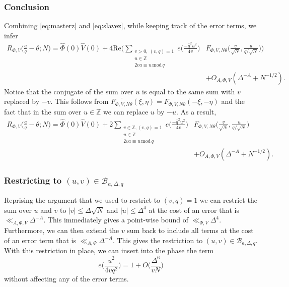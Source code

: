 \documentclass[12pt,reqno]{amsart}
\theoremstyle{plain}
\numberwithin{equation}{section}
\numberwithin{figure}{section}
\theoremstyle{plain}
\theoremstyle{definition}
\theoremstyle{remark}
\newcommand{\mmod}{\,\mathrm{mod}\,}
\begin{document}
\subsubsection{Conclusion} Combining \eqref{eq:masterz} and \eqref{eq:slavez},
while keeping track of the error terms,
we infer
\begin{align*}
R_{\Phi, V} \Big ( \frac{a}{q} - \theta; N \Big ) 
= \widehat{\Phi}(0) \widehat{V}(0) + 4  \mathrm{Re} \Big (  
\sum_{\substack{v > 0, \ (v,q) = 1 \\ u \in \mathbb{Z} \\ 2 v a \equiv u \mmod{q}}}   
e \Big (  \frac{- \overline{q}^2 u^2}{4 v} \Big ) &
 F_{\Phi, V, N \theta} 
 \Big ( \frac{v}{\sqrt{N}}, 
 \frac{u}{q / \sqrt{N}} \Big ) \Big ) \\ & 
 + O_{A, \Phi, V}( \Delta^{-A} + N^{-1/2} ).
\end{align*}
Notice that the conjugate of the sum over $u$ is equal to the same sum with $v$ replaced by $-v$. This follows from $\overline{F_{\Phi, V, N \theta}}(\xi, \eta) = F_{\Phi, V, N \theta}( -\xi, -\eta)$ and the fact that in the sum over $u \in \mathbb{Z}$ we can replace $u$ by $-u$. As a result, 
\begin{align*}
R_{\Phi, V} \Big ( \frac{a}{q} - \theta; N \Big ) 
= \widehat{\Phi}(0)\widehat{V}(0) + 
2 \sum_{\substack{
 v \in \mathbb{Z}, (v,q) = 1 \\ u \in \mathbb{Z} \\ 2 v a \equiv u \mmod{q}}}  
e \Big (  \frac{- \overline{q}^2 u^2}{4 v} \Big ) &
 F_{\Phi, V,N \theta} \Big ( \frac{v}{\sqrt{N}}, \frac{u}{q / \sqrt{N}} \Big ) \\ & + O_{A, \Phi, V}(\Delta^{-A} + N^{-1/2}).
\end{align*}

\subsubsection{Restricting to $(u,v) \in \mathcal{B}_{a, \Delta, q}$}

Reprising the argument that we used to restrict to $(v,q) = 1$ we can restrict the sum over $u$ and $v$ to $|v| \leq \Delta \sqrt{N}$ and $|u| \leq \Delta^4$ at the cost of an error that is $\ll_{A, \Phi, V} \Delta^{-A}$. This immediately gives a point-wise bound of $\ll_{\Phi, V} \Delta^4$. Furthermore, we can then extend the $v$ sum back to include all terms at the cost of an error term that is $\ll_{A, \Phi} \Delta^{-A}$. This gives the restriction to $(u,v) \in \mathcal{B}_{a, \Delta, q}$. 
With this restriction in place, we can insert into the phase the term 
$$
e \Big ( \frac{u^2}{4 v q^2} \Big ) = 1 + O \Big ( \frac{\Delta^6}{v N} \Big )
$$
without affecting any of the error terms.
\end{document}
